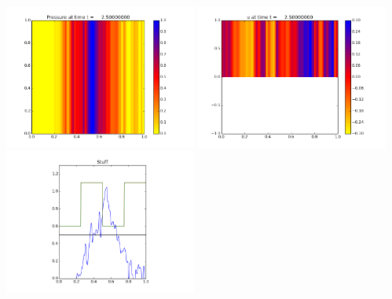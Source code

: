 \documentclass[11pt]{article}
\begin{document}
\vskip 10pt 
\includegraphics[width=0.475\textwidth]{frame0100fig0.png}
\includegraphics[width=0.475\textwidth]{frame0100fig1.png}
\vskip 10pt 
\includegraphics[width=0.475\textwidth]{frame0100fig3.png}
\end{document}

